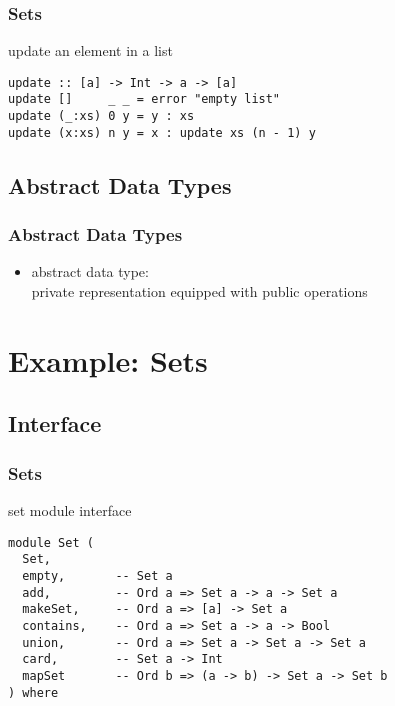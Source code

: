 \documentclass[dvipsnames]{beamer}
\theoremstyle{plain}
\begin{document}
\begin{frame}[fragile]
  \frametitle{Sets}

  \begin{exampleblock}{update an element in a list}
    \begin{lstlisting}
update :: [a] -> Int -> a -> [a]
update []     _ _ = error "empty list"
update (_:xs) 0 y = y : xs
update (x:xs) n y = x : update xs (n - 1) y
    \end{lstlisting}
  \end{exampleblock}
\end{frame}

\subsection{Abstract Data Types}

\begin{frame}
  \frametitle{Abstract Data Types}

  \begin{itemize}
    \item \alert{abstract data type}:\\
      private representation equipped with public operations
  \end{itemize}
\end{frame}

\section{Example: Sets}

\subsection{Interface}

\begin{frame}[fragile]
  \frametitle{Sets}

  \begin{exampleblock}{set module interface}
    \begin{lstlisting}[deletekeywords={union}]
module Set (
  Set,
  empty,       -- Set a
  add,         -- Ord a => Set a -> a -> Set a
  makeSet,     -- Ord a => [a] -> Set a
  contains,    -- Ord a => Set a -> a -> Bool
  union,       -- Ord a => Set a -> Set a -> Set a
  card,        -- Set a -> Int
  mapSet       -- Ord b => (a -> b) -> Set a -> Set b
) where
    \end{lstlisting}
  \end{exampleblock}
\end{frame}
\end{document}
